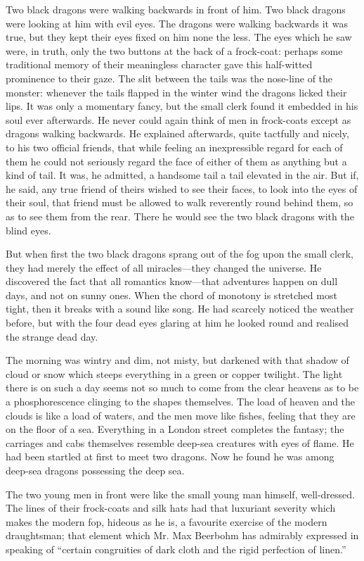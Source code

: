 \documentclass{book}
\begin{document}
Two black dragons were walking backwards in front of him. Two black dragons were looking at him with evil eyes. The dragons were walking backwards it was true, but they kept their eyes fixed on him none the less. The eyes which he saw were, in truth, only the two buttons at the back of a frock-coat: perhaps some traditional memory of their meaningless character gave this half-witted prominence to their gaze. The slit between the tails was the nose-line of the monster: whenever the tails flapped in the winter wind the dragons licked their lips. It was only a momentary fancy, but the small clerk found it embedded in his soul ever afterwards. He never could again think of men in frock-coats except as dragons walking backwards. He explained afterwards, quite tactfully and nicely, to his two official friends, that while feeling an inexpressible regard for each of them he could not seriously regard the face of either of them as anything but a kind of tail. It was, he admitted, a handsome tail a tail elevated in the air. But if, he said, any true friend of theirs wished to see their faces, to look into the eyes of their soul, that friend must be allowed to walk reverently round behind them, so as to see them from the rear. There he would see the two black dragons with the blind eyes.

But when first the two black dragons sprang out of the fog upon the small clerk, they had merely the effect of all miracles—they changed the universe. He discovered the fact that all romantics know—that adventures happen on dull days, and not on sunny ones. When the chord of monotony is stretched most tight, then it breaks with a sound like song. He had scarcely noticed the weather before, but with the four dead eyes glaring at him he looked round and realised the strange dead day.

The morning was wintry and dim, not misty, but darkened with that shadow of cloud or snow which steeps everything in a green or copper twilight. The light there is on such a day seems not so much to come from the clear heavens as to be a phosphorescence clinging to the shapes themselves. The load of heaven and the clouds is like a load of waters, and the men move like fishes, feeling that they are on the floor of a sea. Everything in a London street completes the fantasy; the carriages and cabs themselves resemble deep-sea creatures with eyes of flame. He had been startled at first to meet two dragons. Now he found he was among deep-sea dragons possessing the deep sea.

The two young men in front were like the small young man himself, well-dressed. The lines of their frock-coats and silk hats had that luxuriant severity which makes the modern fop, hideous as he is, a favourite exercise of the modern draughtsman; that element which Mr. Max Beerbohm has admirably expressed in speaking of “certain congruities of dark cloth and the rigid perfection of linen.”
\end{document}
